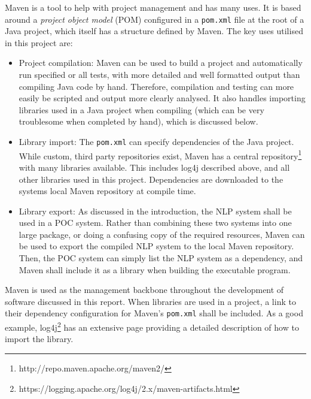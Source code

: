 Maven is a tool to help with project management and has many uses. It is based around a \textit{project object model} (POM) configured in a \texttt{pom.xml} file at the root of a Java project, which itself has a structure defined by Maven. The key uses utilised in this project are:
\begin{itemize}
	\item Project compilation: Maven can be used to build a project and automatically run specified or all tests, with more detailed and well formatted output than compiling Java code by hand. Therefore, compilation and testing can more easily be scripted and output more clearly analysed. It also handles importing libraries used in a Java project when compiling (which can be very troublesome when completed by hand), which is discussed below.
	\item Library import: The \texttt{pom.xml} can specify dependencies of the Java project. While custom, third party repositories exist, Maven has a central repository\footnote{http://repo.maven.apache.org/maven2/} with many libraries available. This includes log4j described above, and all other libraries used in this project. Dependencies are downloaded to the systems local Maven repository at compile time.
	\item Library export: As discussed in the introduction, the NLP system shall be used in a POC system. Rather than combining these two systems into one large package, or doing a confusing copy of the required resources, Maven can be used to export the compiled NLP system to the local Maven repository. Then, the POC system can simply list the NLP system as a dependency, and Maven shall include it as a library when building the executable program.
\end{itemize}

Maven is used as the management backbone throughout the development of software discussed in this report. When libraries are used in a project, a link to their dependency configuration for Maven's \texttt{pom.xml} shall be included. As a good example, log4j\footnote{https://logging.apache.org/log4j/2.x/maven-artifacts.html} has an extensive page providing a detailed description of how to import the library.
